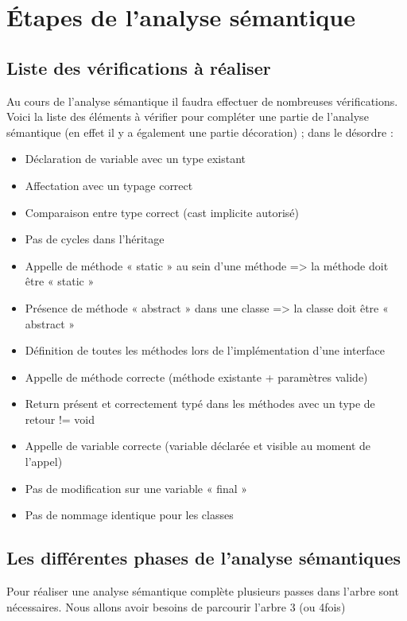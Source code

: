 \documentclass{../../res/univ-projet}
\begin{document}
\section{Étapes de l'analyse sémantique}
 \subsection{Liste des vérifications à réaliser}
  Au cours de l’analyse sémantique il faudra effectuer de nombreuses vérifications. Voici la liste des
  éléments à vérifier pour compléter une partie de l’analyse sémantique (en effet il y a également une
  partie décoration) ; dans le désordre : %
  \begin{itemize}
    \item Déclaration de variable avec un type existant
    \item Affectation avec un typage correct
    \item Comparaison entre type correct (cast implicite autorisé)
    \item Pas de cycles dans l’héritage
    \item Appelle de méthode « static » au sein d’une méthode => la méthode doit être « static »
    \item Présence de méthode « abstract » dans une classe => la classe doit être « abstract »
    \item Définition de toutes les méthodes lors de l’implémentation d’une interface
    \item Appelle de méthode correcte (méthode existante + paramètres valide)
    \item Return présent et correctement typé dans les méthodes avec un type de retour != void
    \item Appelle de variable correcte (variable déclarée et visible au moment de l’appel)
    \item Pas de modification sur une variable « final »
    \item Pas de nommage identique pour les classes
  \end{itemize}

 \subsection{Les différentes phases de l’analyse sémantiques}
  Pour réaliser une analyse sémantique complète plusieurs passes dans l’arbre sont nécessaires.
  Nous allons avoir besoins de parcourir l’arbre 3 (ou 4fois)
\end{document}
